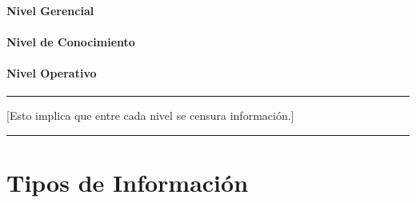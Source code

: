 \paragraph{Nivel Gerencial}
\paragraph{Nivel de Conocimiento}
\paragraph{Nivel Operativo}

\begin{center}\rule{0.5\linewidth}{0.5pt}\end{center}




[Esto implica que entre cada nivel se censura información.]

\begin{center}\rule{0.5\linewidth}{0.5pt}\end{center}

\bigskip \bigskip \bigskip



\hypertarget{tipos-de-informaciuxf3n}{%
\section{Tipos de Información }\label{tipos-de-informaciuxf3n}}

